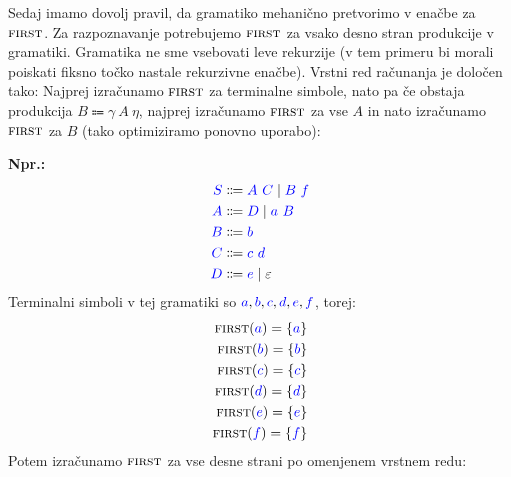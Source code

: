 \documentclass{article}
\newcommand{\Ex}{\textbf{Npr.:}\ }
\newcommand{\FIRST}{\textsc{first}}
\newcommand{\Symbol}[1]{\textcolor{blue}{#1}}
\newcommand{\Null}{\varepsilon}
\newcommand{\Arrow}{\Coloneq}
\newcommand{\Seq}{\ }
\newcommand{\Union}{\mathrel{|}}
\begin{document}
Sedaj imamo dovolj pravil, da gramatiko mehanično pretvorimo v enačbe za $\FIRST$.
Za razpoznavanje potrebujemo $\FIRST$ za vsako desno stran produkcije v gramatiki.
Gramatika ne sme vsebovati leve rekurzije (v tem primeru bi morali poiskati fiksno točko nastale rekurzivne enačbe).
Vrstni red računanja je določen tako: Najprej izračunamo $\FIRST$ za terminalne simbole, nato pa če obstaja produkcija ${B \Arrow \gamma \Seq A \Seq \eta}$, najprej izračunamo $\FIRST$ za vse $A$ in nato izračunamo $\FIRST$ za $B$ (tako optimiziramo ponovno uporabo):

\Ex
\begin{equation*}
  \begin{aligned}
    \Symbol{S} &\Arrow \Symbol{A} \Seq \Symbol{C} \Union \Symbol{B} \Seq \Symbol{f} \\
    \Symbol{A} &\Arrow \Symbol{D} \Union \Symbol{a} \Seq \Symbol{B} \\
    \Symbol{B} &\Arrow \Symbol{b}\\
    \Symbol{C} &\Arrow \Symbol{c} \Seq \Symbol{d}\\
    \Symbol{D} &\Arrow \Symbol{e} \Union \Null
  \end{aligned}
\end{equation*}
Terminalni simboli v tej gramatiki so $\Symbol{a}, \Symbol{b}, \Symbol{c}, \Symbol{d}, \Symbol{e}, \Symbol{f}$, torej:
\begin{align*}
  \FIRST(\Symbol{a}) = \{\Symbol{a}\}\\
  \FIRST(\Symbol{b}) = \{\Symbol{b}\}\\
  \FIRST(\Symbol{c}) = \{\Symbol{c}\}\\
  \FIRST(\Symbol{d}) = \{\Symbol{d}\}\\
  \FIRST(\Symbol{e}) = \{\Symbol{e}\}\\
  \FIRST(\Symbol{f}) = \{\Symbol{f}\}
\end{align*}
Potem izračunamo $\FIRST$ za vse desne strani po omenjenem vrstnem redu:
\end{document}
